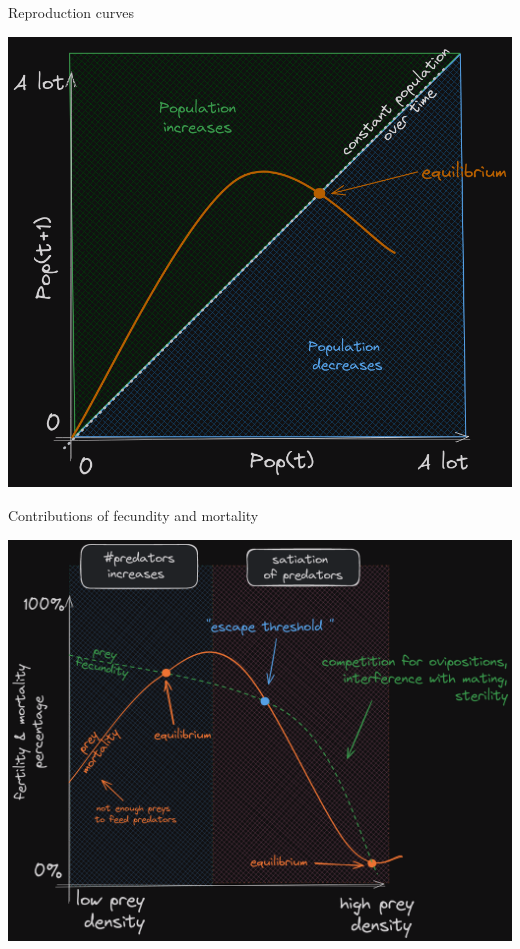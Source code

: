 \documentclass[11,aspectratio=1610]{beamer}
\begin{document}
\begin{frame}{Reproduction curves}

\vfill
\centering
\includegraphics[height=0.8\textheight]{img/repro1.png}
\begin{footnotesize}
\end{footnotesize}

\end{frame}



\begin{frame}{Contributions of fecundity and mortality}

\vfill
\centering
\includegraphics[height=0.8\textheight]{img/repro2.png}
\begin{footnotesize}
\end{footnotesize}

\end{frame}
\end{document}
